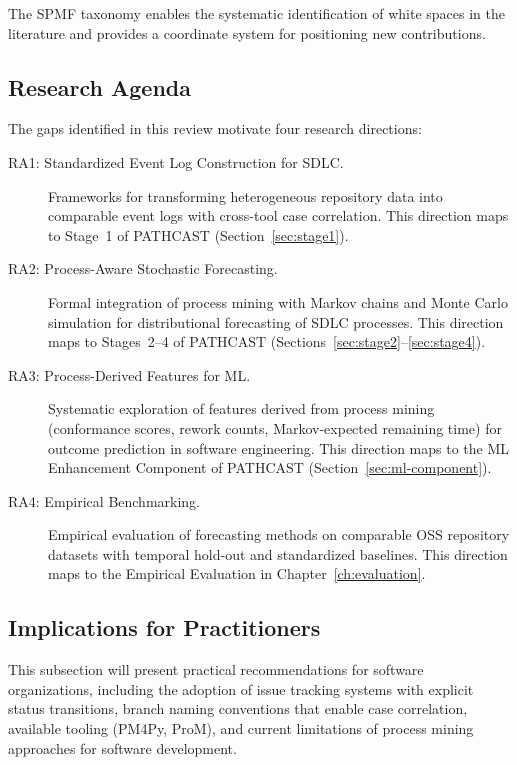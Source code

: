The SPMF taxonomy enables the systematic identification of white spaces in the literature and provides a coordinate system for positioning new contributions.


\subsection{Research Agenda}
\label{sec:slr-agenda}

The gaps identified in this review motivate four research directions:

\begin{description}
\item[RA1: Standardized Event Log Construction for SDLC.] Frameworks for transforming heterogeneous repository data into comparable event logs with cross-tool case correlation. This direction maps to Stage~1 of PATHCAST (Section~\ref{sec:stage1}).

\item[RA2: Process-Aware Stochastic Forecasting.] Formal integration of process mining with Markov chains and Monte Carlo simulation for distributional forecasting of SDLC processes. This direction maps to Stages~2--4 of PATHCAST (Sections~\ref{sec:stage2}--\ref{sec:stage4}).

\item[RA3: Process-Derived Features for ML.] Systematic exploration of features derived from process mining (conformance scores, rework counts, Markov-expected remaining time) for outcome prediction in software engineering. This direction maps to the ML Enhancement Component of PATHCAST (Section~\ref{sec:ml-component}).

\item[RA4: Empirical Benchmarking.] Empirical evaluation of forecasting methods on comparable OSS repository datasets with temporal hold-out and standardized baselines. This direction maps to the Empirical Evaluation in Chapter~\ref{ch:evaluation}.
\end{description}


\subsection{Implications for Practitioners}
\label{sec:slr-practitioners}


This subsection will present practical recommendations for software organizations, including the adoption of issue tracking systems with explicit status transitions, branch naming conventions that enable case correlation, available tooling (PM4Py, ProM), and current limitations of process mining approaches for software development.


